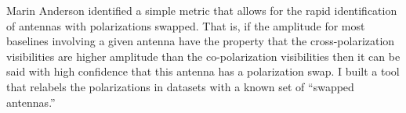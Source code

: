 \begin{bibunit}
Marin Anderson identified a simple metric that allows for the rapid identification of antennas with
polarizations swapped. That is, if the amplitude for most baselines involving a given antenna have
the property that the cross-polarization visibilities are higher amplitude than the co-polarization
visibilities then it can be said with high confidence that this antenna has a polarization swap. I
built a tool that relabels the polarizations in datasets with a known set of ``swapped antennas.''

\end{bibunit}


